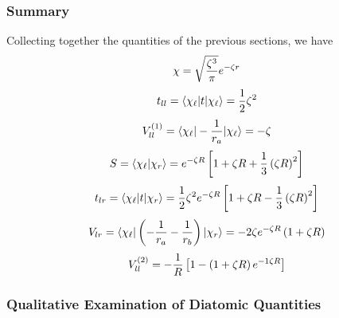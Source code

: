 \subsubsection{Summary}

Collecting together the quantities of the previous sections, we have
\begin{equation}
\chi = \sqrt{{\zeta^3 \over \pi}} e^{- \zeta r}
\end{equation}
\begin{equation}
t_{ll} = \langle \chi_\ell \vert t \vert \chi_\ell \rangle = {1 
\over 2} \zeta^2
\end{equation}
\begin{equation}
V^{(1)}_{ll} = \langle \chi_\ell \vert - {1 \over r_a} \vert \chi_\ell 
\rangle = - \zeta
\end{equation}
\begin{equation}
S = \langle \chi_\ell \vert \chi_r \rangle = e^{- \zeta R} \left[ 1 + 
\zeta R + {1 \over 3} \left( \zeta R \right)^2 \right]
\end{equation}
\begin{equation}
t_{lr} = \langle \chi_\ell \vert t \vert \chi_r \rangle = {1 \over 2} 
\zeta^2 e^{- \zeta R} \left[ 1 + \zeta R - {1 \over 3} 
\left( \zeta R \right)^2 \right]
\end{equation}
\begin{equation}
V_{lr} = \langle \chi_\ell \vert \left( - {1 \over r_a} - {1 \over r_b} 
\right) \vert \chi_r \rangle = - 2 \zeta e^{- \zeta R} \left( 1 + 
\zeta R \right)
\end{equation}
\begin{equation}
V_{ll}^{(2)} = - {1 \over R} \left[ 1 - \left( 1 + \zeta R \right) 
e^{- 1 \zeta R} \right]
\end{equation}

\subsubsection{Qualitative Examination of Diatomic Quantities}

